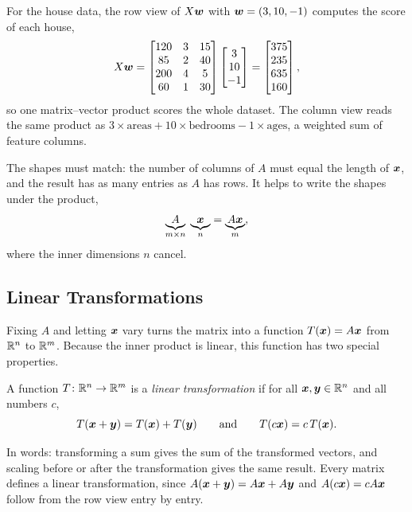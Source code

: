 For the house data, the row view of $X\bm{w}$ with
$\bm{w} = (3, 10, -1)$ computes the score of each house,
\[
  X\bm{w} =
  \begin{bmatrix}
    120 & 3 & 15 \\
    85 & 2 & 40 \\
    200 & 4 & 5 \\
    60 & 1 & 30
  \end{bmatrix}
  \begin{bmatrix} 3 \\ 10 \\ -1 \end{bmatrix}
  = \begin{bmatrix} 375 \\ 235 \\ 635 \\ 160 \end{bmatrix},
\]
so one matrix--vector product scores the whole dataset. The column view
reads the same product as $3 \times \text{areas} + 10 \times
\text{bedrooms} - 1 \times \text{ages}$, a weighted sum of feature
columns.

The shapes must match: the number of columns of $A$ must equal the length
of $\bm{x}$, and the result has as many entries as $A$ has rows. It
helps to write the shapes under the product,
\[
  \underbrace{A}_{m \times n} \; \underbrace{\bm{x}}_{n}
  = \underbrace{A\bm{x}}_{m} ,
\]
where the inner dimensions $n$ cancel.

\subsection{Linear Transformations}
\label{sec:ch03-linear-maps}

Fixing $A$ and letting $\bm{x}$ vary turns the matrix into a function
$T(\bm{x}) = A\bm{x}$ from $\mathbb{R}^n$ to $\mathbb{R}^m$. Because the inner product
is linear, this function has two special properties.

\begin{definition}
  \label{def:linear-map}
  A function $T\colon \mathbb{R}^n \to \mathbb{R}^m$ is a \emph{linear transformation} if
  for all $\bm{x}, \bm{y} \in \mathbb{R}^n$ and all numbers $c$,
  \[
    T(\bm{x} + \bm{y}) = T(\bm{x}) + T(\bm{y})
    \qquad\text{and}\qquad
    T(c\bm{x}) = c\, T(\bm{x}) .
  \]
\end{definition}

In words: transforming a sum gives the sum of the transformed vectors, and
scaling before or after the transformation gives the same result. Every
matrix defines a linear transformation, since $A(\bm{x} + \bm{y}) =
A\bm{x} + A\bm{y}$ and $A(c\bm{x}) = c A\bm{x}$ follow from the
row view entry by entry.

